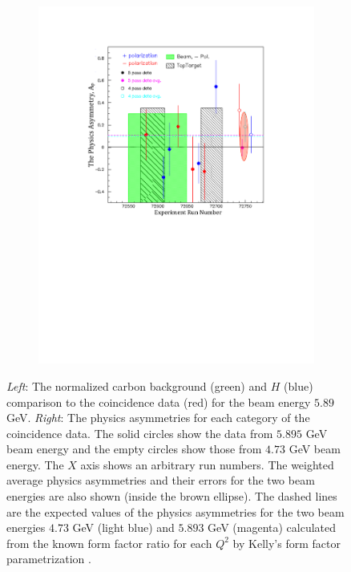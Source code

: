 \documentclass[12pt]{article}
\begin{document}
\begin{figure}[htbp]
\begin{subfigure}[htbp]{0.39\textwidth}
               \includegraphics[width=\textwidth]{simc_ap}
                \label{apsingletb}
        \end{subfigure}    
\caption{\emph{Left}: The normalized carbon background (green) and $H$ (blue) comparison to the coincidence data (red) for the beam energy $5.89$ GeV. \emph{Right}: The physics asymmetries for each category of the coincidence data. The solid circles show the data from $5.895$ GeV beam energy and the empty circles show those from $4.73$ GeV beam energy. The $X$ axis shows an arbitrary run numbers. The weighted average physics asymmetries and their errors for the two beam energies are also shown (inside the brown ellipse). The dashed lines are the expected values of the physics asymmetries for the two beam energies $4.73$ GeV (light blue) and  $5.893$ GeV (magenta) calculated from the known form factor ratio for each $Q^2$ by Kelly's form factor parametrization \cite{99}.}
\label{apcoin}                  
\end{figure}
\end{document}
